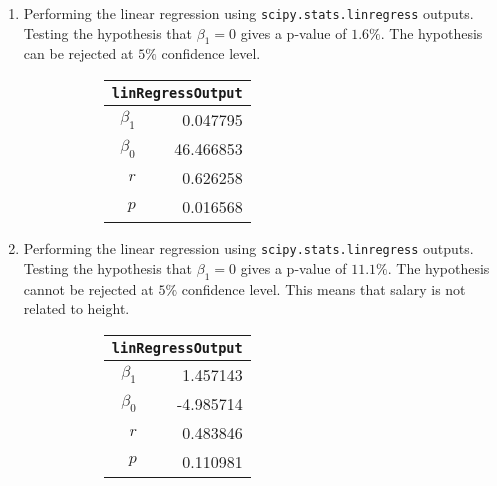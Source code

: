 \begin{enumerate}
\item Performing the linear regression using \texttt{scipy.stats.linregress} outputs.
Testing the hypothesis that $ \beta_1 = 0 $ gives a p-value of $ 1.6\% $. The hypothesis can be rejected at $ 5\% $ confidence level.


\begin{figure}[H]
	\begin{subfigure}[]{0.2\linewidth}
		\centering
		\begin{tabular}{@{}rr@{}}
			\toprule
			\multicolumn{2}{c}{\texttt{linRegressOutput}} \\
			\midrule
			$\beta_1$     &         0.047795 \\
			$\beta_0$ &        46.466853 \\
			$r$    &         0.626258 \\
			$p$    &         0.016568 \\
			\bottomrule
		\end{tabular}
		
	\end{subfigure}
	\begin{subfigure}[]{0.8\linewidth}
		\centering
		
	\end{subfigure}
\end{figure}

\item Performing the linear regression using \texttt{scipy.stats.linregress} outputs.
Testing the hypothesis that $ \beta_1 = 0 $ gives a p-value of $ 11.1\% $. The hypothesis cannot be rejected at $ 5\% $ confidence level. This means that salary is not related to height.

\begin{figure}[H]
	\begin{subfigure}[]{0.2\linewidth}
		\centering
		\begin{tabular}{@{}rr@{}}
			\toprule
			\multicolumn{2}{c}{\texttt{linRegressOutput}} \\
			\midrule
			$\beta_1$     &         1.457143 \\
			$\beta_0$ &        -4.985714 \\
			$r$    &         0.483846 \\
			$p$    &         0.110981 \\
			\bottomrule
		\end{tabular}
		

\end{subfigure}
\end{figure}
\end{enumerate}
